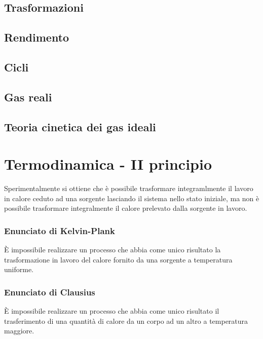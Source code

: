 \section{Trasformazioni}
\section{Rendimento}
\section{Cicli}
\section{Gas reali}
\section{Teoria cinetica dei gas ideali}



\chapter{Termodinamica - II principio}
Sperimentalmente si ottiene che è possibile trasformare integramlmente il lavoro in calore ceduto ad una sorgente lasciando il sistema nello stato iniziale, ma non è possibile trasformare integralmente il calore prelevato dalla sorgente in lavoro.

\begin{center}
	\colorbox{yred}{\begin{minipage}{5.75in}
			\begin{redes}{}
				\subsection{Enunciato di Kelvin-Plank}
				È impossibile realizzare un processo che abbia come unico risultato la trasformazione in lavoro del calore fornito da una sorgente a temperatura uniforme.
				\vspace{0.2cm}
				\subsection{Enunciato di Clausius}
				È impossibile realizzare un processo che abbia come unico risultato il trasferimento di una quantità di calore da un corpo ad un altro a temperatura maggiore.
			\end{redes}
	\end{minipage}}
\end{center}

